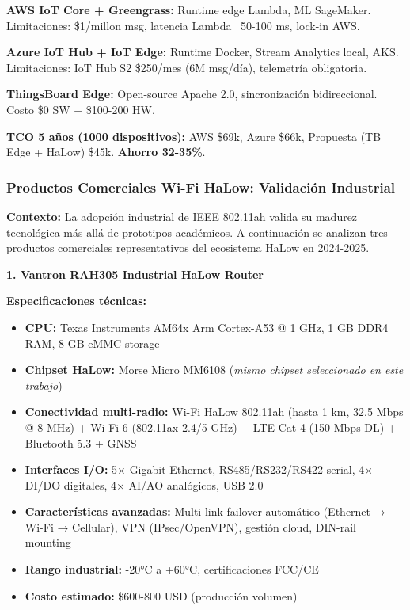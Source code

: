\textbf{AWS IoT Core + Greengrass:} Runtime edge Lambda, ML SageMaker. Limitaciones: \$1/millon msg, latencia Lambda ~50-100 ms, lock-in AWS.

\textbf{Azure IoT Hub + IoT Edge:} Runtime Docker, Stream Analytics local, AKS. Limitaciones: IoT Hub S2 \$250/mes (6M msg/día), telemetría obligatoria.

\textbf{ThingsBoard Edge:} Open-source Apache 2.0, sincronización bidireccional. Costo \$0 SW + \$100-200 HW.

\textbf{TCO 5 años (1000 dispositivos):} AWS \$69k, Azure \$66k, Propuesta (TB Edge + HaLow) \$45k. \textbf{Ahorro 32-35\%}.

\subsubsection{Productos Comerciales Wi-Fi HaLow: Validación Industrial}

\textbf{Contexto:} La adopción industrial de IEEE 802.11ah valida su madurez tecnológica más allá de prototipos académicos. A continuación se analizan tres productos comerciales representativos del ecosistema HaLow en 2024-2025.

\textbf{1. Vantron RAH305 Industrial HaLow Router}~\cite{vantronRAH305WiFiHaLow2024}

\textbf{Especificaciones técnicas:}
\begin{itemize}
    \item \textbf{CPU:} Texas Instruments AM64x Arm Cortex-A53 @ 1 GHz, 1 GB DDR4 RAM, 8 GB eMMC storage
    \item \textbf{Chipset HaLow:} Morse Micro MM6108 (\textit{mismo chipset seleccionado en este trabajo})
    \item \textbf{Conectividad multi-radio:} Wi-Fi HaLow 802.11ah (hasta 1 km, 32.5 Mbps @ 8 MHz) + Wi-Fi 6 (802.11ax 2.4/5 GHz) + LTE Cat-4 (150 Mbps DL) + Bluetooth 5.3 + GNSS
    \item \textbf{Interfaces I/O:} 5$\times$ Gigabit Ethernet, RS485/RS232/RS422 serial, 4$\times$ DI/DO digitales, 4$\times$ AI/AO analógicos, USB 2.0
    \item \textbf{Características avanzadas:} Multi-link failover automático (Ethernet → Wi-Fi → Cellular), VPN (IPsec/OpenVPN), gestión cloud, DIN-rail mounting
    \item \textbf{Rango industrial:} -20°C a +60°C, certificaciones FCC/CE
    \item \textbf{Costo estimado:} \$600-800 USD (producción volumen)
\end{itemize}

